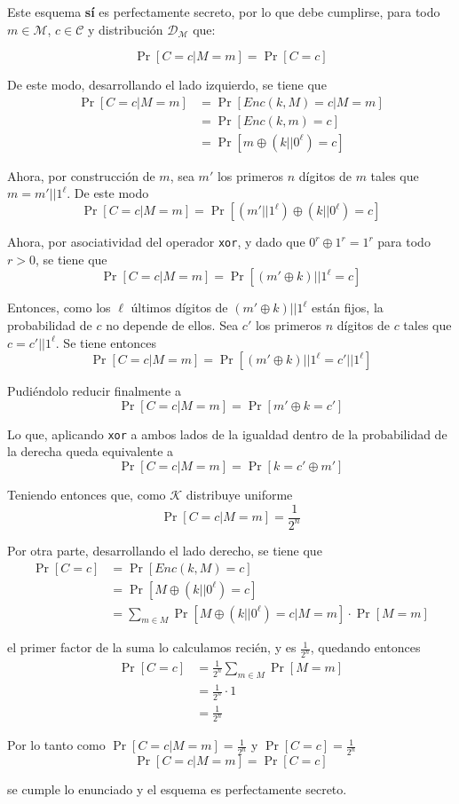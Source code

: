 \documentclass[twoside]{tareas}
\begin{document}
\begin{enumerate}
    Este esquema \textbf{sí} es perfectamente secreto, por lo que debe cumplirse, para todo $m \in \mathcal{M}$, $c \in \mathcal{C}$ y distribución $\mathcal{D}_{\mathcal{M}}$ que:

    $$\Pr[C=c | M=m] = \Pr[C=c]$$

    De este modo, desarrollando el lado izquierdo, se tiene que
    \begin{align*}
        \Pr[C=c | M=m] & = \Pr[Enc(k,M)=c | M=m]\\
        & = \Pr[Enc(k,m)=c]\\
        & = \Pr[m \oplus (k || 0^\ell) = c]
    \end{align*}

    Ahora, por construcción de $m$, sea $m'$ los primeros $n$ dígitos de $m$ tales que $m = m' || 1^\ell$. De este modo
    $$\Pr[C=c | M=m] = \Pr[(m' || 1^\ell) \oplus (k || 0^\ell) = c]$$

    Ahora, por asociatividad del operador \texttt{xor}, y dado que $0^r \oplus 1^r = 1^r$ para todo $r > 0$, se tiene que
    $$\Pr[C=c | M=m] = \Pr[(m' \oplus k) || 1^\ell = c]$$

    Entonces, como los $\ell$ últimos dígitos de $(m' \oplus k) || 1^\ell$ están fijos, la probabilidad de $c$ no depende de ellos. Sea $c'$ los primeros $n$ dígitos de $c$ tales que $c = c' || 1^\ell$. Se tiene entonces
    $$\Pr[C=c | M=m] = \Pr[(m' \oplus k) || 1^\ell = c' || 1^\ell]$$

    Pudiéndolo reducir finalmente a
    $$\Pr[C=c | M=m] = \Pr[m' \oplus k = c']$$

    Lo que, aplicando \texttt{xor} a ambos lados de la igualdad dentro de la probabilidad de la derecha queda equivalente a
    $$\Pr[C=c | M=m] = \Pr[k = c' \oplus m']$$

    Teniendo entonces que, como $\mathcal{K}$ distribuye uniforme
    $$\Pr[C=c | M=m] = \frac{1}{2^n}$$

    Por otra parte, desarrollando el lado derecho, se tiene que
    \begin{align*}
        \Pr[C=c] & = \Pr[Enc(k,M)=c]\\
        & = \Pr[M \oplus (k || 0^\ell) = c]\\
        & = \sum_{m \in M} \Pr[M \oplus (k || 0^\ell) = c | M=m] \cdot \Pr[M=m]
    \end{align*}

    el primer factor de la suma lo calculamos recién, y es $\frac{1}{2^n}$, quedando entonces
    \begin{align*}
        \Pr[C=c] & = \frac{1}{2^n} \sum_{m \in M} \Pr[M=m]\\
        & = \frac{1}{2^n} \cdot 1\\
        & = \frac{1}{2^n}
    \end{align*}

    Por lo tanto como $\Pr[C=c | M=m] = \frac{1}{2^n}$ y $\Pr[C=c] = \frac{1}{2^n}$
    $$\Pr[C=c | M=m] = \Pr[C=c]$$

    se cumple lo enunciado y el esquema es perfectamente secreto.

\end{enumerate}
\end{document}
